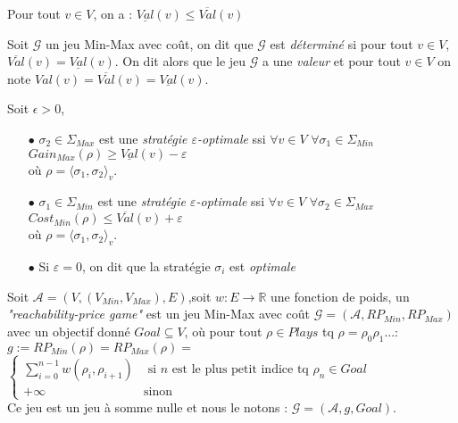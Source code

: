 \begin{propriete}
	Pour tout $v \in V$, on a : $\underline{Val}(v) \leq \overline{Val}(v)$
\end{propriete}


\begin{defi}
		Soit $\mathcal{G}$ un jeu Min-Max avec coût, on dit que $\mathcal{G}$ est \textit{déterminé} si pour tout $v \in V$, $\overline{Val}(v) = \underline{Val}(v)$. On dit alors que le jeu $\mathcal{G}$ a une \textit{valeur} et pour tout $v \in V$ on note $Val(v) = \overline{Val}(v) = \underline{Val}(v)$.
\end{defi}


\begin{defi}
	Soit $\epsilon > 0$,
	\begin{enumerate}
	\item[$\bullet$] $\sigma _{2} \in \Sigma _{Max}$ est une \textit{stratégie $\varepsilon$-optimale} ssi $\forall v \in V $ $ \forall \sigma _{1}\in \Sigma_{Min}$ $ Gain_{Max}(\rho) \geq \underline{Val}(v) - \varepsilon  $\\ où $\rho = \langle \sigma _{1},\sigma _{2} \rangle_v$.
	\item[$\bullet$] $\sigma _{1} \in \Sigma _{Min}$ est une \textit{stratégie $\varepsilon$-optimale} ssi $\forall v \in V $ $ \forall \sigma _{2}\in \Sigma_{Max}$ $Cost_{Min}(\rho) \leq \overline{Val}(v) + \varepsilon $\\ où $\rho = \langle \sigma _{1},\sigma _{2} \rangle_v$.
	\item[$\bullet$] Si $\varepsilon = 0$, on dit que la stratégie $\sigma _{i}$ est \textit{optimale}
	\end{enumerate}
\end{defi}


\begin{defi}
	Soit $\mathcal{A} = (V, (V_{Min}, V_{Max}), E) $,soit $w: E \rightarrow \mathbb{R}$ une fonction de poids,
	un \textit{"reachability-price game"} est un jeu Min-Max avec coût $\mathcal{G} = (\mathcal{A},RP_{Min},RP_{Max})$\\ avec un objectif donné $Goal \subseteq V$, où pour tout $\rho \in Plays$ tq $\rho = \rho _{0}\rho _{1}...$:\\
	
	$g := RP_{Min}(\rho)=RP_{Max}(\rho) =$ $\begin{cases}
									\sum_{i = 0}^{n-1} w(\rho_{i},\rho_{i+1}) & \text{ si } n \text{ est le plus petit indice tq } \rho_{n}\in 					  Goal\\
									+\infty & \text{sinon}
									\end{cases}$ \\
									
  \noindent Ce jeu est un jeu à somme nulle et nous le notons : $\mathcal{G} = (\mathcal{A}, g , Goal)$.
\end{defi}

